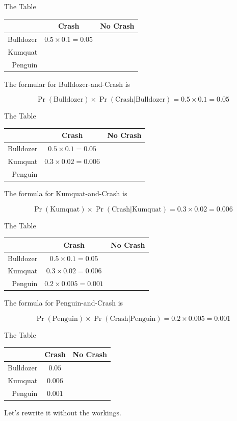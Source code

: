 \documentclass[
  ignorenonframetext,
]{beamer}
\renewcommand{\,}{\text{, }}
\begin{document}
\begin{frame}{The Table}
\protect\hypertarget{the-table-1}{}

\begin{longtable}[]{@{}rcc@{}}
\toprule
& Crash & No Crash\tabularnewline
\midrule
\endhead
Bulldozer & \(0.5 \times 0.1 = 0.05\) &\tabularnewline
Kumquat & &\tabularnewline
Penguin & &\tabularnewline
\bottomrule
\end{longtable}

The formular for Bulldozer-and-Crash is

\[
\Pr(\text{Bulldozer}) \times \Pr(\text{Crash}|\text{Bulldozer}) = 0.5 \times 0.1 = 0.05
\]

\end{frame}

\begin{frame}{The Table}
\protect\hypertarget{the-table-2}{}

\begin{longtable}[]{@{}rcc@{}}
\toprule
& Crash & No Crash\tabularnewline
\midrule
\endhead
Bulldozer & \(0.5 \times 0.1 = 0.05\) &\tabularnewline
Kumquat & \(0.3 \times 0.02 = 0.006\) &\tabularnewline
Penguin & &\tabularnewline
\bottomrule
\end{longtable}

The formula for Kumquat-and-Crash is

\[
\Pr(\text{Kumquat}) \times \Pr(\text{Crash}|\text{Kumquat}) = 0.3 \times 0.02 = 0.006
\]

\end{frame}

\begin{frame}{The Table}
\protect\hypertarget{the-table-3}{}

\begin{longtable}[]{@{}rcc@{}}
\toprule
& Crash & No Crash\tabularnewline
\midrule
\endhead
Bulldozer & \(0.5 \times 0.1 = 0.05\) &\tabularnewline
Kumquat & \(0.3 \times 0.02 = 0.006\) &\tabularnewline
Penguin & \(0.2 \times 0.005 = 0.001\) &\tabularnewline
\bottomrule
\end{longtable}

The formula for Penguin-and-Crash is

\[
\Pr(\text{Penguin}) \times \Pr(\text{Crash}|\text{Penguin}) = 0.2 \times 0.005 = 0.001
\]

\end{frame}

\begin{frame}{The Table}
\protect\hypertarget{the-table-4}{}

\begin{longtable}[]{@{}rcc@{}}
\toprule
& Crash & No Crash\tabularnewline
\midrule
\endhead
Bulldozer & \(0.05\) &\tabularnewline
Kumquat & \(0.006\) &\tabularnewline
Penguin & \(0.001\) &\tabularnewline
\bottomrule
\end{longtable}

Let's rewrite it without the workings.

\end{frame}
\end{document}
